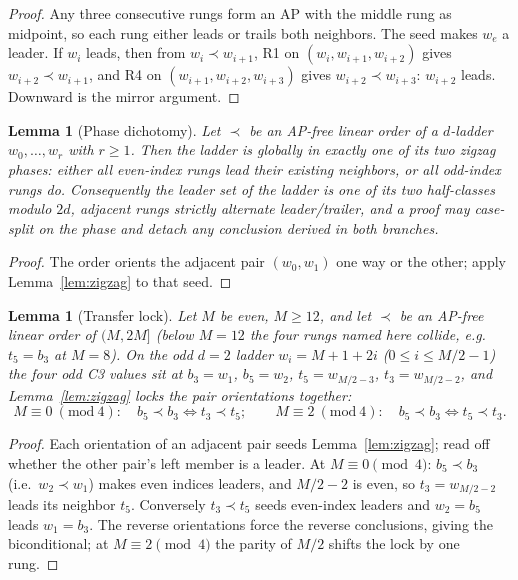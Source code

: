 \documentclass[11pt]{article}
\newtheorem{lemma}[theorem]{Lemma}
\theoremstyle{definition}
\begin{document}
\begin{proof}
Any three consecutive rungs form an AP with the middle rung as
midpoint, so each rung either leads or trails both neighbors. The seed
makes $w_e$ a leader. If $w_i$ leads, then from $w_i \prec w_{i+1}$,
R1 on $(w_i, w_{i+1}, w_{i+2})$ gives $w_{i+2} \prec w_{i+1}$, and R4
on $(w_{i+1}, w_{i+2}, w_{i+3})$ gives $w_{i+2} \prec w_{i+3}$: $w_{i+2}$
leads. Downward is the mirror argument.
\end{proof}

\begin{lemma}[Phase dichotomy]\label{lem:phase}
Let $\prec$ be an AP-free linear order of a $d$-ladder $w_0, \dots, w_r$
with $r \ge 1$. Then the ladder is globally in exactly one of its two
\emph{zigzag phases}: either all even-index rungs lead their existing
neighbors, or all odd-index rungs do. Consequently the \emph{leader set} of the
ladder is one of its two half-classes modulo $2d$, adjacent rungs
strictly alternate leader/trailer, and a proof may case-split on the
phase and detach any conclusion derived in both branches.
\end{lemma}

\begin{proof}
The order orients the adjacent pair $(w_0, w_1)$ one way or the other;
apply Lemma~\ref{lem:zigzag} to that seed.
\end{proof}

\begin{lemma}[Transfer lock]\label{lem:transfer}
Let $M$ be even, $M \ge 12$, and let $\prec$ be an AP-free linear order
of $(M, 2M]$ (below $M = 12$ the four rungs named here
collide, e.g.\ $t_5 = b_3$ at $M = 8$). On the odd $d=2$ ladder $w_i = M + 1 + 2i$
($0 \le i \le M/2 - 1$) the four odd C3 values sit at $b_3 = w_1$,
$b_5 = w_2$, $t_5 = w_{M/2-3}$, $t_3 = w_{M/2-2}$, and
Lemma~\ref{lem:zigzag} locks the pair orientations together:
\[
M \equiv 0 \ (\mathrm{mod}\ 4):\quad b_5 \prec b_3
\iff t_3 \prec t_5;
\qquad
M \equiv 2 \ (\mathrm{mod}\ 4):\quad b_5 \prec b_3 \iff t_5 \prec t_3.
\]
\end{lemma}

\begin{proof}
Each orientation of an adjacent pair seeds Lemma~\ref{lem:zigzag}; read
off whether the other pair's left member is a leader. At
$M \equiv 0 \pmod 4$: $b_5 \prec b_3$ (i.e.\ $w_2 \prec w_1$) makes
even indices leaders, and $M/2 - 2$ is even, so $t_3 = w_{M/2-2}$
leads its neighbor $t_5$. Conversely $t_3 \prec t_5$ seeds even-index
leaders and $w_2 = b_5$ leads $w_1 = b_3$. The reverse orientations
force the reverse conclusions, giving the biconditional; at
$M \equiv 2 \pmod 4$ the parity of $M/2$ shifts the lock by one rung.
\end{proof}
\end{document}
